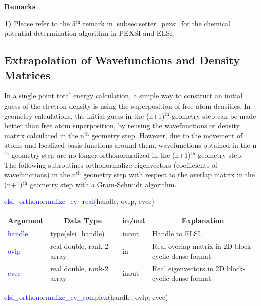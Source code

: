 \documentclass{report}
\begin{document}
\textbf{Remarks}

\textbf{1)} Please refer to the 5$^\text{th}$ remark in \ref{subsec:setter_pexsi} for the chemical potential determination algorithm in PEXSI and ELSI.

\subsection{Extrapolation of Wavefunctions and Density Matrices}
\label{subsec:extrapolation}
In a single point total energy calculation, a simple way to construct an initial guess of the electron density is using the superposition of free atom densities. In geometry calculations, the initial guess in the (n+1)$^\text{th}$ geometry step can be made better than free atom superposition, by reusing the wavefunctions or density matrix calculated in the n$^\text{th}$ geometry step. However, due to the movement of atoms and localized basis functions around them, wavefunctions obtained in the n$^\text{th}$ geometry step are no longer orthonormalized in the (n+1)$^\text{th}$ geometry step. The following subroutines orthonormalize eigenvectors (coefficients of wavefunctions) in the n$^\text{th}$ geometry step with respect to the overlap matrix in the (n+1)$^\text{th}$ geometry step with a Gram-Schmidt algorithm.
\begin{labeling}{\hspace{6cm}}
\item [\hspace{0.3cm} \textcolor{blue}{elsi\_orthonormalize\_ev\_real}(handle, ovlp, evec)]
\end{labeling}

\begin{tabular}[]{|p{20mm}|p{45mm}|p{15mm}|p{85mm}|}
\hline
\multicolumn{1}{|c|}{\textbf{Argument}} & \multicolumn{1}{c|}{\textbf{Data Type}} & \multicolumn{1}{c|}{\textbf{in/out}} & \multicolumn{1}{c|}{\textbf{Explanation}}\\
\hline
\textcolor{blue}{handle} & type(elsi\_handle)        & inout & Handle to ELSI.\\
\hline
\textcolor{blue}{ovlp}   & real double, rank-2 array & in    & Real overlap matrix in 2D block-cyclic dense format.\\
\hline
\textcolor{blue}{evec}   & real double, rank-2 array & inout & Real eigenvectors in 2D block-cyclic dense format.\\
\hline
\end{tabular}

\begin{labeling}{\hspace{6cm}}
\item [\hspace{0.3cm} \textcolor{blue}{elsi\_orthonormalize\_ev\_complex}(handle, ovlp, evec)]
\end{labeling}
\end{document}
